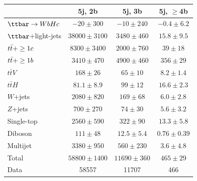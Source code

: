 \begin{table}[htbp]
\begin{center}
\begin{tabular}{l*{3}{c}}
\hline\hline
 & 5j, 2b & 5j, 3b & 5j, $\geq$4b \\
\hline
$\Hc$  &   $ -20 \pm 300 $ &   $ -10 \pm 240 $ &   $ -0.4 \pm 6.2 $ \\ 
\hline
$\ttbar$+light-jets  &   $ 38000 \pm 3100 $ &   $ 3480 \pm 460 $ &   $ 15.8 \pm 9.5 $ \\ 
$t\bar{t}+\geq1c$  &   $ 8300 \pm 3400 $ &   $ 2000 \pm 760 $ &   $ 39 \pm 18 $ \\ 
$t\bar{t}+\geq1b$  &   $ 3410 \pm 470 $ &   $ 4900 \pm 460 $ &   $ 356 \pm 29 $ \\ 
$t\bar{t}V$  &   $ 168 \pm 26 $ &   $ 65 \pm 10 $ &   $ 8.2 \pm 1.4 $ \\ 
$t\bar{t}H$  &   $ 81.1 \pm 8.9 $ &   $ 99 \pm 12 $ &   $ 16.6 \pm 2.3 $ \\ 
$W$+jets  &   $ 2080 \pm 820 $ &   $ 169 \pm 68 $ &   $ 6.0 \pm 2.8 $ \\ 
$Z$+jets  &   $ 700 \pm 270 $ &   $ 74 \pm 30 $ &   $ 5.6 \pm 3.2 $ \\ 
Single-top  &   $ 2560 \pm 590 $ &   $ 322 \pm 90 $ &   $ 13.3 \pm 5.8 $ \\ 
Diboson  &   $ 111 \pm 48 $ &   $ 12.5 \pm 5.4 $ &   $ 0.76 \pm 0.39 $ \\ 
Multijet  &   $ 3380 \pm 950 $ &   $ 560 \pm 230 $ &   $ 3.6 \pm 4.8 $ \\ 
\hline
Total & $ 58800 \pm 1400 $ &   $ 11690 \pm 360 $ &   $ 465 \pm 29 $ \\ 
\hline
Data & 58557  & 11707  & 466  \\ 
\hline\hline      
\end{tabular}
\vspace{0.2cm}


\end{center}
\end{table}
